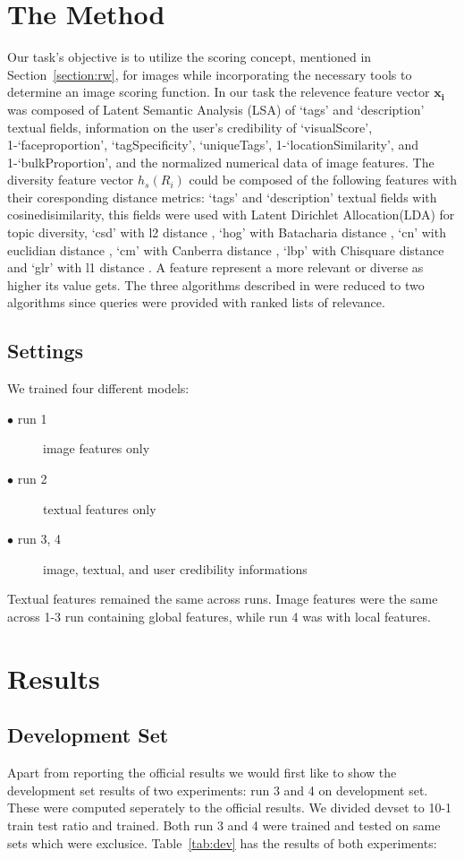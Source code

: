 \documentclass{sig-alternate}
\begin{document}
{\section{The Method}
Our task's objective is to utilize the scoring concept, mentioned in Section~\ref{section:rw}, for images while incorporating the necessary tools to determine an image scoring function. 
In our task the relevence feature vector $\mathbf{x_{i}}$ was composed of Latent Semantic Analysis (LSA) \cite{lsa} of `tags' and `description' textual fields, 
information on the user's credibility of `visualScore', 1-`faceproportion', `tagSpecificity', `uniqueTags', 1-`locationSimilarity', and 1-`bulkProportion',
and the normalized numerical data of image features.
The diversity feature vector $h_{s}(R_{i})$ could be composed of the following features with their coresponding distance metrics: 
`tags' and `description' textual fields with cosinedisimilarity, this fields were used with Latent Dirichlet Allocation(LDA) \cite{lda} for topic diversity, `csd' with l2 distance \cite{csd}, `hog' with Batacharia distance \cite{hog}, `cn' with
euclidian distance \cite{cn}, `cm' with Canberra distance \cite{cm}, `lbp' with Chisquare distance \cite{glbp} and `glr' with l1 distance \cite{glr}. A feature represent a more relevant or diverse as higher its value gets.
The three algorithms described in \cite{fscore} were reduced to two algorithms since queries were provided with ranked lists 
of relevance.


\subsection{Settings}
We trained four different models: 

\begin{description}
  \item[$\bullet$ run 1] image features only
  \item[$\bullet$ run 2] textual features only
  \item[$\bullet$ run 3, 4] image, textual, and user credibility informations
\end{description}
Textual features remained the same across runs. Image features were the same across 1-3 run containing global features, 
while run 4 was with local features.


\section{Results}
\subsection{Development Set}
Apart from reporting the official results we would first like to show the development set results of 
two experiments: run 3 and 4 on development set. These were computed seperately to the official results. We divided devset to 10-1 train test ratio
and trained. Both run 3 and 4 were trained and tested on same sets which were exclusice. 
Table~\ref{tab:dev} has the results of both experiments:

}
\end{document}
